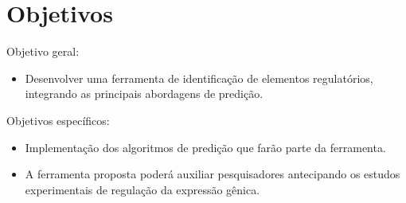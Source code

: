 \chapter{Objetivos}

Objetivo geral:
\begin{itemize}
 \item Desenvolver uma ferramenta de identificação de elementos regulatórios, integrando as principais abordagens de predição.

\end{itemize}

Objetivos específicos:
\begin{itemize}

 \item Implementação dos algoritmos de predição que farão parte da ferramenta.



 \item A ferramenta proposta poderá auxiliar pesquisadores antecipando os estudos experimentais de regulação da expressão gênica.

 \end{itemize}